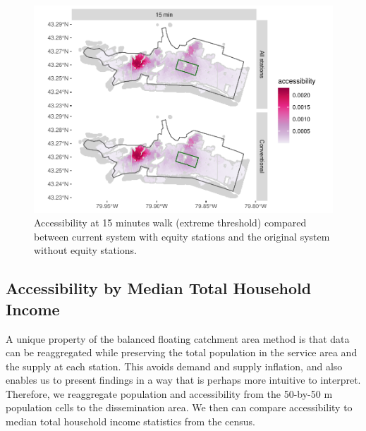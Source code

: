 \documentclass[]{elsarticle} %
\begin{document}
\begin{figure}

{\centering \includegraphics[width=0.9\linewidth]{Bike-share-spatial-equity_files/figure-latex/figure-9-1} 

}

\caption{Accessibility at 15 minutes walk (extreme threshold) compared between current system with equity stations and the original system without equity stations.}\label{fig:figure-9}
\end{figure}

\hypertarget{accessibility-by-median-total-household-income}{%
\subsection{Accessibility by Median Total Household
Income}\label{accessibility-by-median-total-household-income}}

A unique property of the balanced floating catchment area method is that
data can be reaggregated while preserving the total population in the
service area and the supply at each station. This avoids demand and
supply inflation, and also enables us to present findings in a way that
is perhaps more intuitive to interpret. Therefore, we reaggregate
population and accessibility from the 50-by-50 m population cells to the
dissemination area. We then can compare accessibility to median total
household income statistics from the census.
\end{document}
